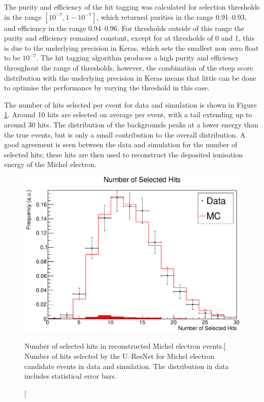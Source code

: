 The purity and efficiency of the hit tagging was calculated for selection 
thresholds in the range $[10^{-7}, 1 - 10^{-7}]$, which returned purities in 
the range 0.91--0.93, and efficiency in the range 0.94--0.96. For thresholds 
outside of this range the purity and efficiency remained constant, except 
for at thresholds of 0 and 1, this is due to the underlying precision in 
Keras, which sets the smallest non--zero float to be $10^{-7}$. The hit tagging 
algorithm produces a high purity and efficiency throughout the range of 
thresholds, however, the combination of the steep score distribution with the 
underlying precision in Keras means that little can be done to optimise the 
performance by varying the threshold in this case.

The number of hits selected per event for data and simulation is shown in
Figure \ref{fig:mich_n_hits}. Around 10 hits are selected on average per 
event, with a tail extending up to around 30 hits. The distribution of the 
backgrounds peaks at a lower energy than the true events, but is only a small
contribution to the overall distribution. A good agreement is seen between the 
data and simulation for the number of selected hits; these hits are then used 
to reconstruct the deposited ionisation energy of the Michel electron.
\begin{figure}
	\centering
	\includegraphics[width=\textwidth]{figures/mich_n_hits.pdf}
	\caption
	[Number of selected hits in reconstructed Michel electron events.]
	{Number of hits selected by the U--ResNet for Michel electron candidate
	events in data and simulation. The distribution in data includes statistical
	error bars.}
	\label{fig:mich_n_hits}
\end{figure}

